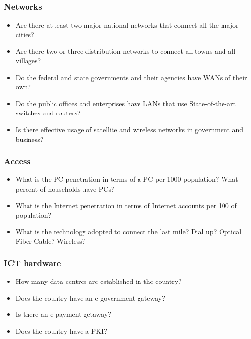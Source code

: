 \subsubsection*{Networks}
\begin{itemize}
	\item Are there at least two major national networks that connect all the major cities? 
	\item Are there two or three distribution networks to connect all towns and all villages? 

	\item Do the federal and state governments and their agencies have WANs of their own? 

	\item Do the public offices and enterprises have LANs that use State-of-the-art switches and routers? 
	\item Is there effective usage of satellite and wireless networks in government and business?
\end{itemize}

\subsubsection*{Access}
\begin{itemize}
	\item What is the PC penetration in terms of a PC per 1000 population? What percent of households have PCs?

	\item What is the Internet penetration in terms of Internet accounts per 100 of population?

	\item What is the technology adopted to connect the last mile? Dial up? Optical Fiber Cable? Wireless?
\end{itemize}

\subsubsection*{ICT hardware}
\begin{itemize}
	\item How many data centres are established in the country?

	\item Does the country have an e-government gateway?

	\item Is there an e-payment getaway?

	\item Does the country have a PKI?
\end{itemize}

